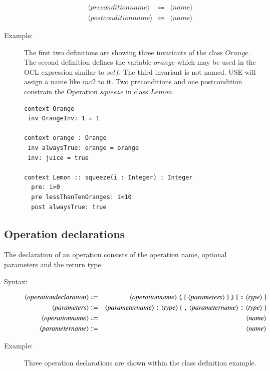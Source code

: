 \documentclass[a4paper,titlepage,oneside,final]{scrreprt} %
\begin{document}
\begin{description}
\begin{eqnarray*}
\langle\mathit{preconditionname}\rangle &\Coloneqq& \langle\mathit{name}\rangle\\
\langle\mathit{postconditionname}\rangle &\Coloneqq& \langle\mathit{name}\rangle
\end{eqnarray*}
\item[Example:] The first two definitions are showing three invariants of the class $\mathit{Orange}$.
The second definition defines the variable $\mathit{orange}$ which
may be used in the OCL expression similar to $\mathit{self}$. The third invariant is not named. USE
will assign a name like $\mathit{inv2}$ to it.
Two preconditions and one postcondition constrain the Operation $\mathit{squeeze}$ in class
$\mathit{Lemon}$.
\begin{verbatim}
context Orange
 inv OrangeInv: 1 = 1

context orange : Orange
 inv alwaysTrue: orange = orange
 inv: juice = true

context Lemon :: squeeze(i : Integer) : Integer
  pre: i>0
  pre lessThanTenOranges: i<10
  post alwaysTrue: true
\end{verbatim}
\end{description}
\subsection{Operation declarations}
The declaration of an operation  consists of the operation name, optional parameters
and the return type.
\begin{description}
\item[Syntax:]
\begin{eqnarray*}
\langle\mathit{operationdeclaration}\rangle &\Coloneqq&
\langle\mathit{operationname}\rangle~\verb+(+~[~\langle\mathit{parameters}\rangle~]~
\verb+)+~[~\verb+:+~\langle\mathit{type}\rangle~]\\
\langle\mathit{parameters}\rangle &\Coloneqq&
\langle\mathit{parametername}\rangle~\verb+:+~\langle\mathit{type}\rangle~
\{~\verb+,+~\langle\mathit{parametername}\rangle~\verb+:+~\langle\mathit{type}\rangle~\}\\
\langle\mathit{operationname}\rangle &\Coloneqq& \langle\mathit{name}\rangle\\
\langle\mathit{parametername}\rangle &\Coloneqq& \langle\mathit{name}\rangle
\end{eqnarray*}
\item[Example:] Three operation declarations are shown within the class definition example.
\end{description}
\end{document}
